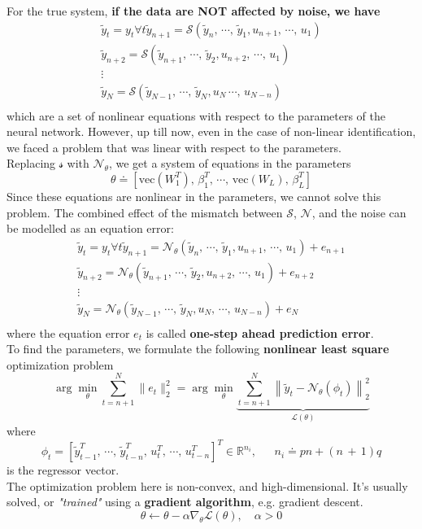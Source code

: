 For the true system, \textbf{if the data are NOT affected by noise, we have}
\[
\begin{array}{c}
\tilde{y}_t = y_t \forall t
\tilde{y}_{n+1} = \mathcal{S}(\tilde{y}_n,\,\cdots,\,\tilde{y}_1,u_{n+1} ,\,\cdots,\,u_1) \\
\tilde{y}_{n+2} = \mathcal{S}(\tilde{y}_{n+1},\, \cdots,\,\tilde{y}_2,u_{n+2} ,\,\cdots,\,u_1) \\
\vdots \\
\tilde{y}_{N} = \mathcal{S}(\tilde{y}_{N-1},\,\cdots,\,\tilde{y}_N,u_N \,\cdots,\,u_{N-n}) \\
\end{array}
\]
which are a set of nonlinear equations with respect to the parameters of the neural network. However, up till now, even in the case of non-linear identification, we faced a problem that was linear with respect to the parameters.\\

Replacing $\mathcal{s}$ with $\mathcal{N}_\theta$, we get a system of equations in the parameters
\[
\theta \doteq [\text{vec}(W_1^T),\,\beta_1^T,\,\cdots,\, \text{vec}(W_L),\,\beta_L^T]
\]
Since these equations are nonlinear in the parameters, we cannot solve this problem. The combined effect of the mismatch between $\mathcal{S}$, $\mathcal{N}$, and the noise can be modelled as an equation error:
\[
\begin{array}{c}
\tilde{y}_t = y_t \forall t
\tilde{y}_{n+1} = \mathcal{N}_\theta(\tilde{y}_n,\,\cdots,\,\tilde{y}_1,u_{n+1} ,\,\cdots,\,u_1)  + e_{n+1}\\
\tilde{y}_{n+2} =\mathcal{N}_\theta(\tilde{y}_{n+1},\,\cdots,\,\tilde{y}_2,u_{n+2} ,\,\cdots,\,u_1)    + e_{n+2}\\
\vdots \\
\tilde{y}_{N} = \mathcal{N}_\theta(\tilde{y}_{N-1},\,\cdots,\,\tilde{y}_N,u_N ,\,\cdots,\,u_{N-n})    + e_{N} \\
\end{array}
\]
where the equation error $e_t$ is called \textbf{one-step ahead prediction error}.\\

To find the parameters, we formulate the following \textbf{nonlinear least square} optimization problem
\[
\arg \min\limits_{\theta} \sum\limits_{t=n+1}^{N} \|e_t\|_2^2 = \arg\min_{\theta} 
\underbrace{
\sum_{t=n+1}^{N} 
\left\| \tilde{y}_t - \mathcal{N}_{\theta}(\phi_t) \right\|_2^2
}_{\mathcal{L}(\theta)}
\]
where 
\[
\phi_t = [\tilde{y}_{t-1}^T,\,\cdots,\,\tilde{y}_{t-n}^T,\,u_t^T,\,\cdots,\,u_{t-n}^T]^T \in \mathbb{R}^{n_i},\:\:\:\:\:\:\: n_i \doteq pn + (n\,+\,1)q
\]
is the regressor vector.\\
The optimization problem here is non-convex, and high-dimensional. It's usually solved, or \textit{"trained"} using a \textbf{gradient algorithm}, e.g. gradient descent.
\[
\theta \gets \theta - \alpha \nabla_{\theta} \mathcal{L}(\theta), \quad \alpha > 0
\]

